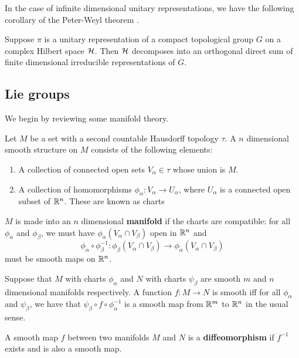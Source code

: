 \documentclass[a4paper]{article}
\begin{document}
In the case of infinite dimensional unitary representations, we have the following corollary of the Peter-Weyl theorem \cite{alex}.

\begin{prop}
    Suppose $\pi$ is a unitary representation of a compact topological group $G$ on a complex Hilbert space $\mathcal{H}$. Then $\mathcal{H}$ decomposes into an orthogonal direct sum of finite dimensional irreducible representations of $G$.
\end{prop}

\subsection{Lie groups}
We begin by reviewing some manifold theory.

\begin{defi}[Manifold]
    Let $M$ be a set with a second countable Hausdorff topology $\tau$. A $n$ dimensional smooth structure on $M$ consists of the following elements:
    \begin{enumerate}
        \item A collection of connected open sets $V_\alpha \in \tau$ whose union is $M$. 
        \item A collection of homomorphisms $\phi_\alpha : V_\alpha \to U_\alpha$, where $U_\alpha$ is a connected open subset of $\mathbb{R}^n$. These are known as charts
    \end{enumerate}
    $M$ is made into an $n$ dimensional \textbf{manifold} if the charts are compatible: for all $\phi_\alpha$ and $\phi_\beta$, we must have $\phi_\alpha(V_\alpha \cap V_\beta)$ open in $\mathbb{R}^n$ and $$\phi_\alpha \circ  \phi_\beta ^{-1}: \phi_\beta(V_\alpha \cap V_\beta) \to \phi_\alpha(V_\alpha \cap V_\beta)$$ must be smooth maps on $\mathbb{R}^n$.
\end{defi}

\begin{defi}
    Suppose that $M$ with charts $\phi_\alpha$ and $N$ with charts $\psi_\beta$ are smooth $m$ and $n$ dimensional manifolds respectively. A function $f: M \to N$ is smooth iff for all $\phi_\alpha$ and $\psi_\beta$, we have that $\psi_\beta \circ f \circ \phi_\alpha^{-1}$ is a smooth map from $\mathbb{R}^m$ to $\mathbb{R}^n$ in the usual sense.
\end{defi}

\begin{defi}[Diffeomorphism]
    A smooth map $f$ between two manifolds $M$ and $N$ is a \textbf{diffeomorphism} if $f^{-1}$ exists and is also a smooth map.
\end{defi}
\end{document}
